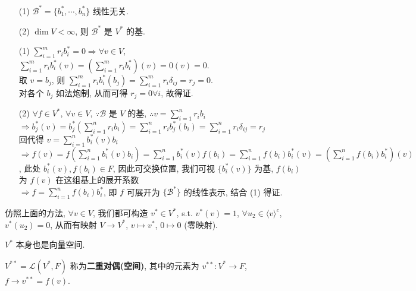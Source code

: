 \documentclass{note}
\begin{document}
\begin{thm}[(课本定理 3.12)]
    \begin{itemize}
        \item[(1)] $\mathcal{B}^*=\{b_1^*,\cdots,b_n^*\}$ 线性无关.
        \item[(2)] $\dim V<\infty$, 则 $\mathcal{B}^*$ 是 $V^*$ 的基.
    \end{itemize}
\end{thm}
\begin{pf}
    \begin{itemize}
        \item[(1)] $\sum_{i=1}^mr_ib_i^*=0\Longrightarrow\forall v\in V$, $\sum_{i=1}^mr_ib_i^*(v)=\left(\sum_{i=1}^mr_ib_i^*\right)(v)=0(v)=0$.\\
        取 $v=b_j$, 则 $\sum_{i=1}^mr_ib_i^*(b_j)=\sum_{i=1}^mr_i\delta_{ij}=r_j=0$.\\
        对各个 $b_j$ 如法炮制, 从而可得 $r_j=0\forall i$, 故得证.
        \item[(2)] $\forall f\in V^*$, $\forall v\in V$, $\because\mathcal{B}$ 是 $V$ 的基, $\therefore v=\sum_{i=1}^nr_ib_i$\\
        $\Longrightarrow b_j^*(v)=b_j^*\left(\sum_{i=1}^nr_ib_i\right)=\sum_{i=1}^nr_ib_j^*(b_i)=\sum_{i=1}^nr_i\delta_{ij}=r_j$\\
        回代得 $v=\sum_{i=1}^nb_i^*(v)b_i$\\
        $\Longrightarrow f(v)=f\left(\sum_{i=1}^nb_i^*(v)b_i\right)=\sum_{i=1}^nb_i^*(v)f(b_i)=\sum_{i=1}^nf(b_i)b_i^*(v)=\left(\sum_{i=1}^nf(b_i)b_i^*\right)(v)$, 此处 $b_i^*(v),f(b_i)\in F$, 因此可交换位置, 我们可视 $\{b_i^*(v)\}$ 为基, $f(b_i)$ 为 $f(v)$ 在这组基上的展开系数\\
        $\Longrightarrow f=\sum_{i=1}^nf(b_i)b_i^*$, 即 $f$ 可展开为 $\{\mathcal{B}^*\}$ 的线性表示, 结合 (1) 得证.
    \end{itemize}
\end{pf}

仿照上面的方法, $\forall v\in V$, 我们都可构造 $v^*\in V^*$, s.t. $v^*(v)=1$, $\forall u_2\in\langle v\rangle^c$, $v^*(u_2)=0$, 从而有映射 $V\rightarrow V^*$, $v\mapsto v^*$, $0\mapsto 0$ (零映射).

$V^*$ 本身也是向量空间.

\begin{df}[二重对偶(空间)]
    $V^{**}=\mathcal{L}(V^*,F)$ 称为\textbf{二重对偶(空间)}, 其中的元素为 $v^{**}:V^*\rightarrow F$, $f\rightarrow v^{**}=f(v)$.
\end{df}
\end{document}
